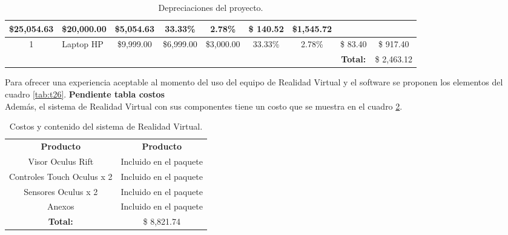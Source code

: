 \begin{table}[H]
{\begin{tabular}{clccccc|c|c|}
  \multicolumn{1}{c|}{\$25,054.63} &
  \multicolumn{1}{c|}{\$20,000.00} &
  \multicolumn{1}{c|}{\$5,054.63} &
  \multicolumn{1}{c|}{33.33\%} &
  2.78\% &
  \$ 140.52 &
  \$1,545.72 \\ \hline
\multicolumn{1}{|c|}{\cellcolor[HTML]{C0C0C0}1} &
  \multicolumn{1}{l|}{Laptop HP} &
  \multicolumn{1}{c|}{\$9,999.00} &
  \multicolumn{1}{c|}{\$6,999.00} &
  \multicolumn{1}{c|}{\$3,000.00} &
  \multicolumn{1}{c|}{33.33\%} &
  2.78\% &
  \$ 83.40 &
  \$ 917.40 \\ \hline
\multicolumn{7}{l}{} &
  \textbf{Total:} &
  \$ 2,463.12 \\ \cline{8-9} 
\end{tabular}
}
\caption{Depreciaciones del proyecto.}
\label{tab:t25}
\end{table}

Para ofrecer una experiencia aceptable al momento del uso del equipo de Realidad Virtual y el software se proponen los elementos del cuadro \ref{tab:t26}.
\textbf{Pendiente tabla costos}\\
Además, el sistema de Realidad Virtual con sus componentes tiene un costo que se muestra en el cuadro \ref{tab:t27}.
\begin{table}[H]
  \centering
  \begin{tabular}{|c|c|}
  \hline
  \rowcolor[HTML]{9B9B9B} 
  \multicolumn{2}{|c|}{\cellcolor[HTML]{9B9B9B}\textbf{Sistema de Realidad Virtual}} \\ \hline
  \rowcolor[HTML]{9B9B9B} 
  \textbf{Producto}                          & \textbf{Producto}                     \\ \hline
  Visor Oculus Rift                          & Incluido en el paquete                \\ \hline
  Controles Touch Oculus x 2                 & Incluido en el paquete                \\ \hline
  Sensores Oculus x 2                        & Incluido en el paquete                \\ \hline
  Anexos                                     & Incluido en el paquete                \\ \hline
  \textbf{Total:}                            & \$ 8,821.74                           \\ \hline
  \end{tabular}
  \caption{Costos y contenido del sistema de Realidad Virtual.}
  \label{tab:t27}
\end{table}

